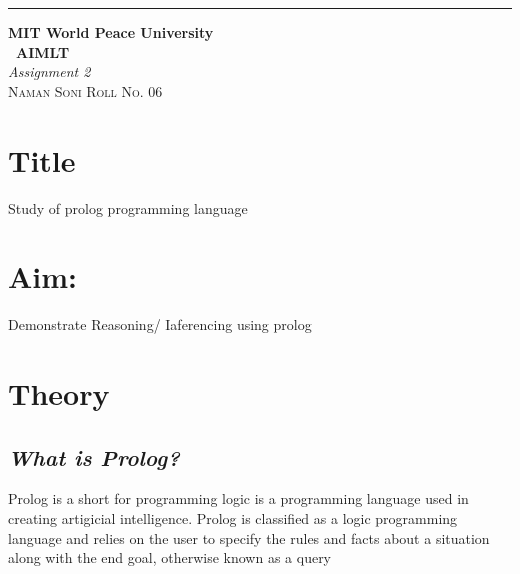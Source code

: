 \documentclass{article}
\begin{document}
\begin{titlepage} %

	\raggedleft\rule{1pt}{\textheight} %
	\hspace{0.05\textwidth} %
	\parbox[b]{0.75\textwidth}
    { %
		
		{\Huge\bfseries MIT World Peace University \\[0.5\baselineskip] \ AIMLT}\\[2\baselineskip] %
		{\large\textit{Assignment 2}}\\[4\baselineskip] %
		{\Large\textsc{Naman Soni Roll No. 06}} %
		
		\vspace{0.5\textheight} %
	}

\end{titlepage}
\tableofcontents
\pagebreak
\section{\textbf{Title}}
Study of prolog programming language
\section{\textbf{Aim:}}
Demonstrate Reasoning/ Iaferencing using prolog
\section{\textbf{Theory}}
\subsection{\textit{What is Prolog?}}
Prolog is a short for programming logic is a programming language used in creating artigicial intelligence. Prolog is classified as a logic programming language and relies on the user to specify the rules and facts about a situation along with the end goal, otherwise known as a query
\end{document}
